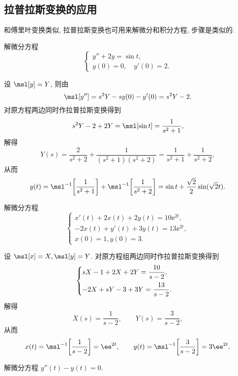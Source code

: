 \subsection{拉普拉斯变换的应用}

和傅里叶变换类似, 拉普拉斯变换也可用来解微分和积分方程, 步骤是类似的.

\begin{example}
  解微分方程
  \[
    \begin{cases}
      y''+2y=\sin t,\\
      y(0)=0,\quad y'(0)=2.
    \end{cases}
  \]
\end{example}

\begin{solution}
  设 $\msl[y]=Y$, 则由\thmLDif
  \[
     \msl[y'']
    =s^2Y-sy(0)-y'(0)
    =s^2Y-2.
  \]
  对原方程两边同时作拉普拉斯变换得到
  \[
     s^2Y-2+2Y
    =\msl[\sin t]
    =\frac{1}{s^2+1},
  \]
  解得
  \[
     Y(s)
    =\frac{2}{s^2+2}+\frac{1}{(s^2+1)(s^2+2)}
    =\frac{1}{s^2+1}+\frac{1}{s^2+2},
  \]
  从而
  \[
     y(t)
    =\msl^{-1}\biggl[\frac{1}{s^2+1}\biggr]+\msl^{-1}\biggl[\frac{1}{s^2+2}\biggr]
    =\sin t+\frac{\sqrt 2}2\sin(\sqrt 2 t).
  \]
\end{solution}

\begin{example}
  解微分方程
  \[
    \begin{cases}
      x'(t)+2x(t)+2y(t)=10\ee^{2t}, \\
      -2x(t)+y'(t)+3y(t)=13\ee^{2t}, \\
      x(0)=1,y(0)=3.
    \end{cases}
  \]
\end{example}

\begin{solution}
  设 $\msl[x]=X,\msl[y]=Y$.
  对原方程组两边同时作拉普拉斯变换得到
  \[
    \begin{cases}
      sX-1+2X+2Y=\dfrac{10}{s-2},\\[2\itemsep]
      -2X+sY-3+3Y=\dfrac{13}{s-2}.
    \end{cases}
  \]
  解得
  \[
    X(s)=\frac1{s-2},\qquad 
    Y(s)=\frac3{s-2},
  \]
  从而
  \[
     x(t)
    =\msl^{-1}\biggl[\frac1{s-2}\biggr]
    =\ee^{2t},\qquad
     y(t)
    =\msl^{-1}\biggl[\frac3{s-2}\biggr]
    =3\ee^{2t}.
  \]
\end{solution}

\begin{example}
  解微分方程 $y''(t)-y(t)=0$.
\end{example}

